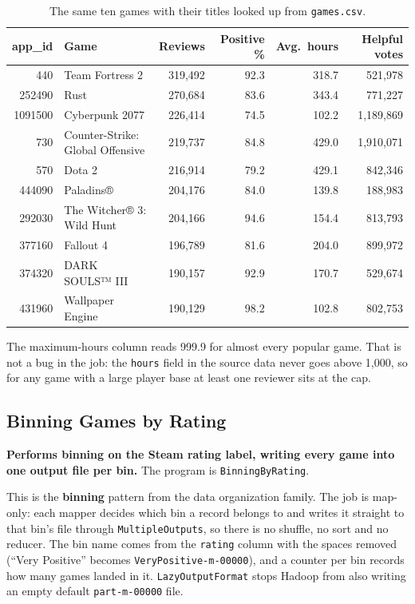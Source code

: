 \documentclass[11pt,a4paper]{article}
\newcommand{\code}[1]{\texttt{#1}}
\begin{document}
\begin{table}[H]\centering\small
\begin{tabular}{rlrrrr}
\toprule
app\_id & Game & Reviews & Positive \% & Avg.\ hours & Helpful votes \\
\midrule
440     & Team Fortress 2                  & 319,492 & 92.3 & 318.7 & 521,978 \\
252490  & Rust                             & 270,684 & 83.6 & 343.4 & 771,227 \\
1091500 & Cyberpunk 2077                   & 226,414 & 74.5 & 102.2 & 1,189,869 \\
730     & Counter-Strike: Global Offensive & 219,737 & 84.8 & 429.0 & 1,910,071 \\
570     & Dota 2                           & 216,914 & 79.2 & 429.1 & 842,346 \\
444090  & Paladins®                        & 204,176 & 84.0 & 139.8 & 188,983 \\
292030  & The Witcher® 3: Wild Hunt        & 204,166 & 94.6 & 154.4 & 813,793 \\
377160  & Fallout 4                        & 196,789 & 81.6 & 204.0 & 899,972 \\
374320  & DARK SOULS™ III                  & 190,157 & 92.9 & 170.7 & 529,674 \\
431960  & Wallpaper Engine                 & 190,129 & 98.2 & 102.8 & 802,753 \\
\bottomrule
\end{tabular}
\caption{The same ten games with their titles looked up from \code{games.csv}.}
\end{table}

The maximum-hours column reads 999.9 for almost every popular game. That is not a bug in the job: the
\code{hours} field in the source data never goes above 1,000, so for any game with a large player
base at least one reviewer sits at the cap.

\subsection{Binning Games by Rating}
\textbf{Performs binning on the Steam rating label, writing every game into one output file per
bin.} The program is \code{BinningByRating}.

This is the \textbf{binning} pattern from the data organization family. The job is map-only: each
mapper decides which bin a record belongs to and writes it straight to that bin's file through
\code{MultipleOutputs}, so there is no shuffle, no sort and no reducer. The bin name comes from the
\code{rating} column with the spaces removed (``Very Positive'' becomes \code{VeryPositive-m-00000}),
and a counter per bin records how many games landed in it. \code{LazyOutputFormat} stops Hadoop from
also writing an empty default \code{part-m-00000} file.
\end{document}
